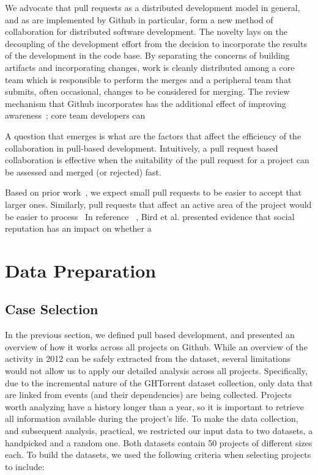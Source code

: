 \documentclass{sig-alternate}
\begin{document}
We advocate that pull requests as a distributed development model in general,
and as are implemented by Github in particular, form a new method of
collaboration for distributed software development. The novelty lays on
the decoupling of the development effort from the decision to incorporate
the results of the development in the code base. 
By separating the concerns of building artifacts and incorporating
changes, work is cleanly distributed among a core team which is responsible
to perform the merges and a peripheral team that submits, often occasional,
changes to be considered for merging. 
The review mechanism that Github incorporates has the additional effect of
improving awareness~\cite{Dabbi12}; core team developers can 

A question that emerges is what are the factors that affect the efficiency
of the collaboration in pull-based development. Intuitively, a pull request
based collaboration is effective when the suitability of the pull request for
a project can be assessed and merged (or rejected) fast. 

Based on prior work~\cite{Weiss08}, we expect small pull requests to be easier to accept that larger ones. Similarly, pull requests that affect an active
area of the project would be easier to process~
In reference ~\cite{Bird07}, Bird et al. presented evidence that social
reputation has an impact on whether a

\section{Data Preparation}

\subsection{Case Selection}
In the previous section, we defined pull based development, and presented an
overview of how it works across all projects on Github. While an overview of the
activity in 2012 can be safely extracted from the dataset, several limitations
would not allow us to apply our detailed analysis across all projects.
Specifically, due to the incremental nature of the GHTorrent dataset collection,
only data that are linked from events (and their dependencies) are being
collected. Projects worth analyzing have a history longer than a year, so it is
important to retrieve all information available during the project's life. To
make the data collection, and subsequent analysis, practical, we restricted our
input data to two datasets, a \textsf{handpicked} and a \textsf{random} one. 
Both datasets contain 50 projects of different sizes each. 
To build the datasets, we used the following criteria when selecting projects to include:
\end{document}
